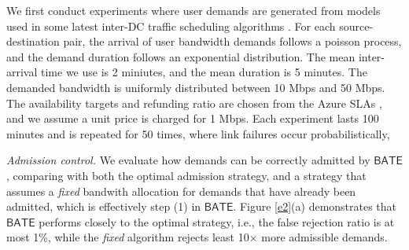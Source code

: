 \documentclass[sigconf]{acmart}
\begin{document}












%



We first conduct experiments where user demands are generated from models used 
in some latest inter-DC traffic scheduling algorithms \cite{Guaranteeings,Online-deadline}. 
For each source-destination pair, the arrival of user bandwidth demands follows a poisson process, 
and the demand duration follows an exponential distribution.  
The mean inter-arrival time we use is 2 miniutes, and the mean duration is 5 minutes. 
The demanded bandwidth is uniformly distributed between 10 Mbps and 50 Mbps.
The availability targets and refunding ratio are chosen from the Azure SLAs \cite{azure}, 
and we assume a unit price is charged for 1 Mbps. 
Each experiment lasts 100 minutes and is repeated for 50 times, 
where link failures occur probabilistically, 

\textit{Admission control.} We evaluate how demands can be correctly admitted by $\mathsf{BATE}$, 
comparing with both the optimal admission strategy, 
and a strategy that assumes a \textit{fixed} bandwith allocation for demands that have already been admitted, which is effectively step (1) in $\mathsf{BATE}$.
Figure \ref{e2}(a) demonstrates that $\mathsf{BATE}$ performs closely to the optimal strategy, 
i.e., the false rejection ratio is at most 1\%, while the \textit{fixed} algorithm 
rejects least 10$\times$ more admissible demands. 
\end{document}
